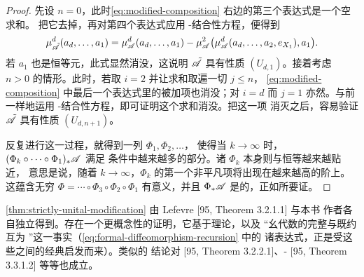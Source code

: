 \begin{proof}
先设 $n=0$，此时\eqref{eq:modified-composition} 右边的第三个表达式是一个空求和。
把它去掉，再对第四个表达式应用 \trAinfty-结合性方程，便得到
\begin{equation*}
\mu^d_{\tilde{\mathscr{A}}}(a_d,\ldots,a_1)=\mu^d_{\mathscr{A}}(a_d,\ldots,a_1)
-\mu^2_{\mathscr{A}}\bigl(\mu^d_{\mathscr{A}}(a_d,\ldots,a_2,e_{X_1}),a_1\bigr).
\end{equation*}
若 $a_1$ 也是恒等元，此式显然消没，这说明 $\tilde{\mathscr{A}}$ 具有性质
$(U_{d,1})$。接着考虑 $n>0$ 的情形。此时，若取 $i=2$ 并让求和取遍一切 $j\le n$，
\eqref{eq:modified-composition} 中最后一个表达式里的被加项也消没；对 $i=d$ 而
$j=1$ 亦然。与前一样地运用 \trAinfty-结合性方程，即可证明这个求和消没。把这一项
消灭之后，容易验证 $\tilde{\mathscr{A}}$ 具有性质 $(U_{d,n+1})$。

反复进行这一过程，就得到一列\trFormalDiffeomorphism{} $\Phi_1,\Phi_2,\ldots$，
使得当 $k\to\infty$ 时，$(\Phi_k\circ\cdots\circ\Phi_1)_*\mathscr{A}$ 满足%
\trStrictlyUnital{}条件中越来越多的部分。诸 $\Phi_k$ 本身则与恒等越来越贴近，
意思是说，随着 $k\to\infty$，$\Phi_k$ 的第一个非平凡项将出现在越来越高的阶上。
这蕴含无穷\trComposition{} $\Phi=\cdots\circ\Phi_3\circ\Phi_2\circ\Phi_1$ 有意义，并且
$\Phi_*\mathscr{A}$ 是\trStrictlyUnital{}的，正如所要证。
\end{proof}

\begin{remark}\label{thm:strictly-unital-history}
\cref{thm:strictly-unital-modification} 由 Lefevre [95, Theorem 3.2.1.1] 与本书
作者各自独立得到。存在一个更概念性的证明，它基于\trHomology{}\trPerturbation{}理论，以及
“幺代数的完整\trHochschild\trComplex{}与既约\trHochschild\trComplex{}互为%
\trQuasiisomorphism”这一事实（\eqref{eq:formal-diffeomorphism-recursion} 中的
诸表达式，正是受这些\trComplex{}之间的经典\trHomotopyEquivalence{}启发而来）。类似的
结论对 \trAFunctor{} [95, Theorem 3.2.2.1]、\trAinfty-\trModule{} [95,
Theorem 3.3.1.2] 等等也成立。
\end{remark}
